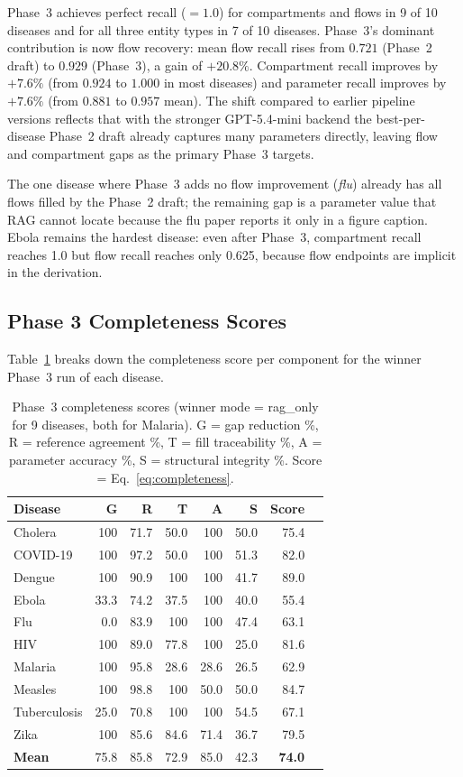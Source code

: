 Phase~3 achieves perfect recall ($= 1.0$) for compartments and flows in 9 of 10 diseases
and for all three entity types in 7 of 10 diseases.
Phase~3's dominant contribution is now flow recovery: mean flow recall rises
from $0.721$ (Phase~2 draft) to $0.929$ (Phase~3), a gain of $+20.8\%$.
Compartment recall improves by $+7.6\%$ (from $0.924$ to $1.000$ in most diseases)
and parameter recall improves by $+7.6\%$ (from $0.881$ to $0.957$ mean).
The shift compared to earlier pipeline versions reflects that with the stronger
GPT-5.4-mini backend the best-per-disease Phase~2 draft already captures many
parameters directly, leaving flow and compartment gaps as the primary Phase~3 targets.

The one disease where Phase~3 adds no flow improvement (\emph{flu}) already has
all flows filled by the Phase~2 draft; the remaining gap is a parameter value that RAG
cannot locate because the flu paper reports it only in a figure caption.
Ebola remains the hardest disease: even after Phase~3, compartment recall reaches 1.0
but flow recall reaches only 0.625, because flow endpoints are implicit in the derivation.

\subsection{Phase 3 Completeness Scores}

Table~\ref{tab:completeness} breaks down the completeness score per component
for the winner Phase~3 run of each disease.

\begin{table}[t]
\caption{Phase~3 completeness scores (winner mode = rag\_only for 9 diseases, both for Malaria).
G = gap reduction \%, R = reference agreement \%, T = fill traceability \%,
A = parameter accuracy \%, S = structural integrity \%. Score = Eq.~\eqref{eq:completeness}.}
\label{tab:completeness}
\small
\setlength{\tabcolsep}{4pt}
\begin{tabular}{lrrrrrrr}
\toprule
Disease & G & R & T & A & S & \textbf{Score} \\
\midrule
Cholera      & 100 & 71.7 & 50.0 & 100 & 50.0 & 75.4 \\
COVID-19     & 100 & 97.2 & 50.0 & 100 & 51.3 & 82.0 \\
Dengue       & 100 & 90.9 & 100  & 100 & 41.7 & 89.0 \\
Ebola        & 33.3& 74.2 & 37.5 & 100 & 40.0 & 55.4 \\
Flu          & 0.0 & 83.9 & 100  & 100 & 47.4 & 63.1 \\
HIV          & 100 & 89.0 & 77.8 & 100 & 25.0 & 81.6 \\
Malaria      & 100 & 95.8 & 28.6 & 28.6& 26.5 & 62.9 \\
Measles      & 100 & 98.8 & 100  & 50.0& 50.0 & 84.7 \\
Tuberculosis & 25.0& 70.8 & 100  & 100 & 54.5 & 67.1 \\
Zika         & 100 & 85.6 & 84.6 & 71.4& 36.7 & 79.5 \\
\midrule
\textbf{Mean}& 75.8& 85.8 & 72.9 & 85.0& 42.3 & \textbf{74.0} \\
\bottomrule
\end{tabular}
\end{table}

